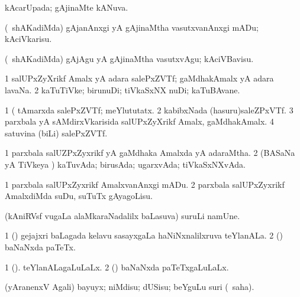 \bentry
{} 
\gl{\gu}
\expl{}
\bmng
 kAcarUpada; gAjinaMte kANuva. 
\emng
\eentry

\bentry 
{} 
\gl{\akirx}
\expl{}
\bmng
 (\kanmu\ shAKadiMda) gAjanAnxgi yA gAjinaMtha vasutxvanAnxgi mADu; kAciVkarisu. 
\emng

\noindent 
\gl{\akirx}
\expl{}
\bmng
 (\kanmu\ shAKadiMda) gAjAgu yA gAjinaMtha vasutxvAgu; kAciVBavisu. 
\emng
\eentry

\bentry 
{} 
\gl{\nA}
\expl{}
\bmng
\bnum
\num{1} salUPxZyXrikf Amalx yA adara salePxZVTf; gaMdhakAmalx yA adara lavaNa. 
\num{2} kaTuTiVke; birunuDi; tiVkaSxNX nuDi; kaTuBAvane. 
\enum
\emng

\noindent 
\gl{\pagu}
\expl{}
\bmng
\bnum
\num{1}  (  tAmarxda salePxZVTf; meYlututatx. 
\num{2}  kabibxNada (hasuru)saleZPxVTf. 
\num{3}  parxbala yA sAMdirxVkarisida salUPxZyXrikf Amalx, gaMdhakAmalx. 
\num{4}  satuvina (biLi) salePxZVTf. 
\enum
\emng
\eentry

\bentry
{} 
\gl{\gu}
\expl{}
\bmng
\bnum
\num{1} parxbala salUZPxZyxrikf yA gaMdhaka Amalxda yA adaraMtha. 
\num{2} (BASaNa yA TiVkeya \vi) kaTuvAda; birusAda; ugarxvAda; tiVkaSxNXvAda. 
\enum
\emng
\eentry

\bentry 
{} 
\gl{\sakirx}
\expl{}
\bmng
\bnum
\num{1} parxbala salUPxZyxrikf AmalxvanAnxgi mADu. 
\num{2} parxbala salUPxZyxrikf AmalxdiMda suDu, suTuTx gAyagoLisu. 
\enum
\emng
\eentry

\bentry 
{} 
\gl{\nA}
\expl{}
\bmng
 (kAniRVsf \mo vugaLa alaMkaraNadalilx baLasuva) suruLi namUne. 
\emng
\eentry

\bentry 
{} 
\gl{\nA}
\bmng
\bnum
\num{1} (\savi) gejajxri baLagada kelavu sasayxgaLa haNiNxnalilxruva teYlanALa. 
\num{2} (\pArxvi) baNaNxda paTeTx. 
\enum
\emng
\eentry

\bentry 
{} 
\gl{\gu}
\expl{}
\bmng
\bnum
\num{1} (\savi). teYlanALagaLuLaLx. 
\num{2} (\pArxvi) baNaNxda paTeTxgaLuLaLx. 
\enum
\emng
\eentry

\bentry
{} 
\gl{\sakirx}
\expl{}
\bmng
 (yAranenxV Agali) bayuyx; niMdisu; dUSisu; beYguLu suri (\akirx\ saha). 
\emng
\eentry


